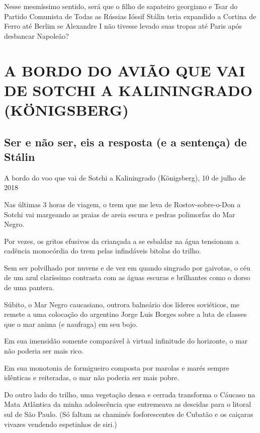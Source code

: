 Nesse mesmíssimo sentido, será que o filho de sapateiro georgiano e Tsar
do Partido Comunista de Todas as Rússias Ióssif Stálin teria expandido a
Cortina de Ferro até Berlim se Alexandre I não tivesse levado suas
tropas até Paris após desbancar Napoleão?

\part{A BORDO DO AVIÃO QUE VAI DE SOTCHI A KALININGRADO (KÖNIGSBERG)}

\chapter*{Ser e não ser, eis a resposta (e a sentença) de Stálin}

\begin{flushright}
A bordo do voo que vai de Sotchi a Kaliningrado (Königsberg),
10 de julho de 2018
\end{flushright}

Nas últimas 3 horas de viagem, o trem que me leva de Rostov-sobre-o-Don
a Sotchi vai margeando as praias de areia escura e pedras polimorfas do
Mar Negro.

Por vezes, os gritos efusivos da criançada a se esbaldar na água
tensionam a cadência monocórdia do trem pelas infindáveis bitolas do
trilho.

Sem ser polvilhado por nuvens e de vez em quando singrado por gaivotas,
o céu de um azul claríssimo contrasta com as águas escuras e brilhantes
como o dorso de uma pantera.

Súbito, o Mar Negro caucasiano, outrora balneário dos líderes
soviéticos, me remete a uma colocação do argentino Jorge Luis Borges
sobre a luta de classes que o mar anima (e naufraga) em seu bojo.

Em sua imensidão somente comparável à virtual infinitude do horizonte, o
mar não poderia ser mais rico.

Em sua monotonia de formigueiro composta por marolas e marés sempre
idênticas e reiteradas, o mar não poderia ser mais pobre.

Do outro lado do trilho, uma vegetação densa e cerrada transforma o
Cáucaso na Mata Atlântica da minha adolescência que entremeava as
descidas para o litoral sul de São Paulo. (Só faltam as chaminés
fosforescentes de Cubatão e os caiçaras vivazes vendendo espetinhos de
siri.)

